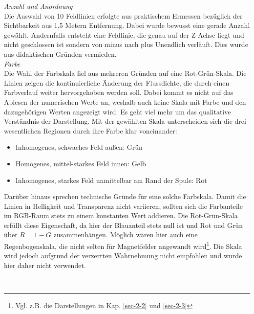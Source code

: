 \textit{Anzahl und Anordnung}\\
Die Auswahl von 10 Feldlinien erfolgte aus praktischem Ermessen bezüglich der Sichtbarkeit aus 1,5 Metern Entfernung. Dabei wurde bewusst eine gerade Anzahl gewählt. Andernfalls entsteht eine Feldlinie, die genau auf der Z-Achse liegt und nicht geschlossen ist sondern von minus nach plus Unendlich verläuft. Dies wurde aus didaktischen Gründen vermieden.\\

\textit{Farbe}\\
Die Wahl der Farbskala fiel aus mehreren Gründen auf eine Rot-Grün-Skala. Die Linien zeigen die kontinuierliche Änderung der Flussdichte, die durch einen Farbverlauf weiter hervorgehoben werden soll. Dabei kommt es nicht auf das Ablesen der numerischen Werte an, weshalb auch keine Skala mit Farbe und den dazugehörigen Werten angezeigt wird. Es geht viel mehr um das qualitative Verständnis der Darstellung. Mit der gewählten Skala unterscheiden sich die drei wesentlichen Regionen durch ihre Farbe klar voneinander:
\begin{itemize}
	\setlength{\itemsep}{-1pt}
	\singlespacing
	\item Inhomogenes, schwaches Feld außen: Grün
	\item Homogenes, mittel-starkes Feld innen: Gelb
	\item Inhomogenes, starkes Feld unmittelbar am Rand der Spule: Rot
\end{itemize}

Darüber hinaus sprechen technische Gründe für eine solche Farbskala. Damit die Linien in Helligkeit und Transparenz nicht variieren, sollten sich die Farbanteile im RGB-Raum stets zu einem konstanten Wert addieren. Die Rot-Grün-Skala erfüllt diese Eigenschaft, da hier der Blauanteil stets null ist und Rot und Grün über $R = 1 - G$ zusammenhängen. Möglich wären hier auch eine Regenbogenskala, die nicht selten für Magnetfelder angewandt wird\footnote{Vgl. z.B. die Darstellungen in Kap. \ref{sec-2-2} und \ref{sec-2-3}}. Die Skala wird jedoch aufgrund der verzerrten Wahrnehmung nicht empfohlen und wurde hier daher nicht verwendet.

\vspace{4px}
\begin{center}
	\\
\end{center}
\vspace{6px}

